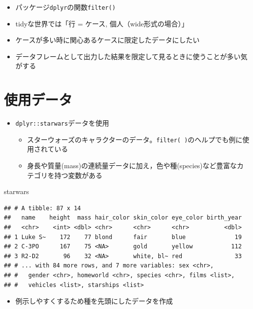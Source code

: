 \documentclass[
  xelatex,ja=standard, b5paper]{bxjsbook}
\newenvironment{Shaded}{\begin{snugshade}}{\end{snugshade}}
\newcommand{\NormalTok}[1]{#1}
\providecommand{\tightlist}{%
  \setlength{\itemsep}{0pt}\setlength{\parskip}{0pt}}
\begin{document}
\begin{itemize}
\tightlist
\item
  パッケージ\texttt{dplyr}の関数\texttt{filter()}
\item
  tidyな世界では「行 = ケース, 個人（wide形式の場合）」
\item
  ケースが多い時に関心あるケースに限定したデータにしたい
\item
  データフレームとして出力した結果を限定して見るときに使うことが多い気がする
\end{itemize}

\hypertarget{ux4f7fux7528ux30c7ux30fcux30bf}{%
\section{使用データ}\label{ux4f7fux7528ux30c7ux30fcux30bf}}

\begin{itemize}
\tightlist
\item
  \texttt{dplyr::starwars}データを使用

  \begin{itemize}
  \tightlist
  \item
    スターウォーズのキャラクターのデータ。\texttt{filter(\ )}のヘルプでも例に使用されている
  \item
    身長や質量(mass)の連続量データに加え，色や種(species)など豊富なカテゴリを持つ変数がある
  \end{itemize}
\end{itemize}

\begin{Shaded}
\begin{Highlighting}[]
\NormalTok{starwars}
\end{Highlighting}
\end{Shaded}

\begin{verbatim}
## # A tibble: 87 x 14
##   name    height  mass hair_color skin_color eye_color birth_year
##   <chr>    <int> <dbl> <chr>      <chr>      <chr>          <dbl>
## 1 Luke S~    172    77 blond      fair       blue              19
## 2 C-3PO      167    75 <NA>       gold       yellow           112
## 3 R2-D2       96    32 <NA>       white, bl~ red               33
## # ... with 84 more rows, and 7 more variables: sex <chr>,
## #   gender <chr>, homeworld <chr>, species <chr>, films <list>,
## #   vehicles <list>, starships <list>
\end{verbatim}

\begin{itemize}
\tightlist
\item
  例示しやすくするため種を先頭にしたデータを作成
\end{itemize}
\end{document}
